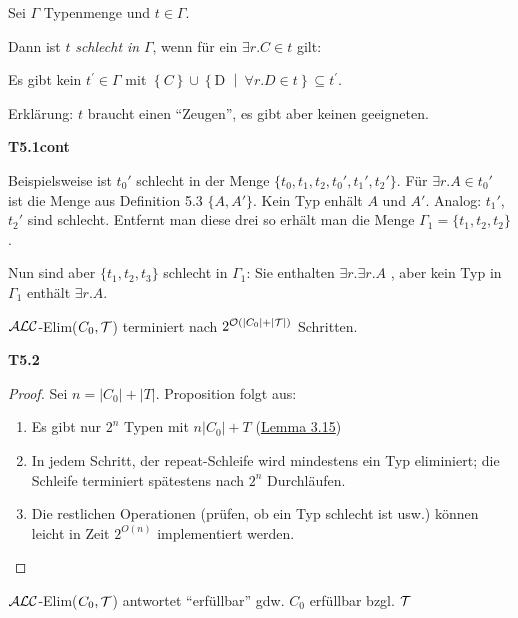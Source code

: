 \begin{definition}

Sei $\Gamma$ Typenmenge und $t \in \Gamma$.

Dann ist $t$ \emph{schlecht in} $\Gamma$, wenn für ein $\exists r.C \in t$ gilt:

\begin{center}Es gibt kein $t^{'} \in \Gamma$ mit
$\left\{ C \right\} \cup \left\{ \text{D\ } \middle| \ \forall r.D \in t \right\} \subseteq t^{'}$.\end{center}
\end{definition}

Erklärung: $t$ braucht einen \enquote{Zeugen}, es gibt aber keinen
geeigneten.

\textbf{T5.1cont}

Beispielsweise ist $t_0'$ schlecht in der Menge $\{t_0,t_1,t_2,t_0',t_1',t_2'\}$. Für $\exists r.A \in t_0'$ ist die Menge aus Definition 5.3 $\{A,A'\}$. Kein Typ enhält $A$ und $A'$. Analog: $t_1'$, $t_2'$ sind schlecht. Entfernt man diese drei so erhält man die Menge $\Gamma_1 = \{t_1,t_2,t_2\}$. 

Nun sind aber $\{t_1,t_2,t_3\}$ schlecht in $\Gamma_1$: Sie enthalten $\exists r. \exists r.A$ , aber kein Typ in $\Gamma_1$ enthält $\exists r.A$.

\begin{proposition}
$\mathcal{A}\mathcal{L}\mathcal{C}$-Elim($C_0,\mathcal{T}$) terminiert nach $2^{\mathcal{O}(|C_0|+|\mathcal{T}|)}$ Schritten.
\end{proposition}

\textbf{T5.2}

\begin{proof}
Sei $n = \left| C_{0} \right| + |T|$. Proposition folgt aus:

\begin{enumerate}
\def\labelenumi{\arabic{enumi}.}
\item
  Es gibt nur $2^{n}$ Typen mit $n \left| C_{0} \right| + T$
  (\protect\hyperlink{lemma-3.15}{Lemma 3.15})
\item
  In jedem Schritt, der repeat-Schleife wird mindestens ein Typ
  eliminiert; die Schleife terminiert spätestens nach $2^{n}$
  Durchläufen.
\item
  Die restlichen Operationen (prüfen, ob ein Typ schlecht ist usw.)
  können leicht in Zeit $2^{O\left( n \right)}$ implementiert werden.
\end{enumerate}
\end{proof}

\begin{proposition}
    $\mathcal{A}\mathcal{L}\mathcal{C}$-Elim($C_0,\mathcal{T}$) antwortet \enquote{erfüllbar} gdw. $C_0$ erfüllbar bzgl. $\mathcal{T}$
\end{proposition}

